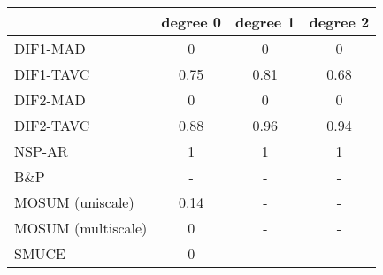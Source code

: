 \begin{tabular}{|l|c|c|c|}
  \hline
 & degree 0 & degree 1 & degree 2 \\ 
  \hline
DIF1-MAD & 0 & 0 & 0 \\ 
  DIF1-TAVC & 0.75 & 0.81 & 0.68 \\ 
  DIF2-MAD & 0 & 0 & 0 \\ 
  DIF2-TAVC & 0.88 & 0.96 & 0.94 \\ 
  NSP-AR & 1 & 1 & 1 \\ 
  B\&P & - & - & - \\ 
  MOSUM (uniscale) & 0.14 & - & - \\ 
  MOSUM (multiscale) & 0 & - & - \\ 
  SMUCE & 0 & - & - \\ 
   \hline
\end{tabular}
